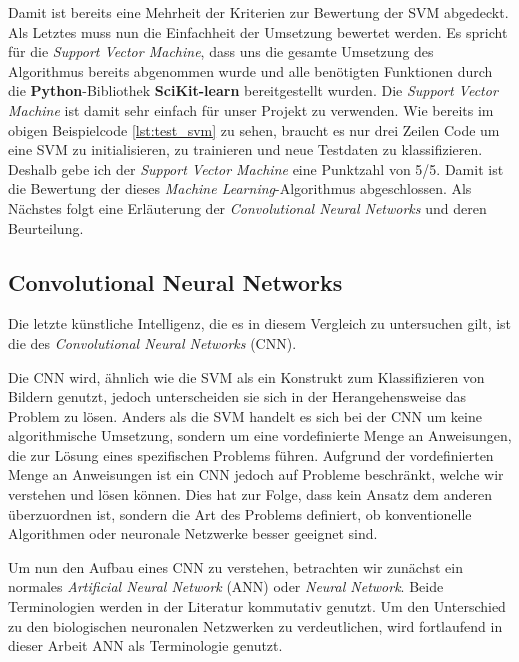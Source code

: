 Damit ist bereits eine Mehrheit der Kriterien zur Bewertung der SVM abgedeckt. Als Letztes muss nun die Einfachheit der Umsetzung bewertet werden.
Es spricht für die \textit{Support Vector Machine}, dass uns die gesamte Umsetzung des Algorithmus bereits abgenommen wurde und alle benötigten
Funktionen durch die \textbf{Python}-Bibliothek \textbf{SciKit-learn} bereitgestellt wurden. Die \textit{Support Vector Machine} ist damit sehr einfach
für unser Projekt zu verwenden.  Wie bereits im obigen Beispielcode \ref{lst:test_svm} zu sehen, braucht es nur drei Zeilen Code um eine SVM zu initialisieren,
zu trainieren und neue Testdaten zu klassifizieren. Deshalb gebe ich der \textit{Support Vector Machine} eine Punktzahl von 5/5.
Damit ist die Bewertung der dieses \textit{Machine Learning}-Algorithmus abgeschlossen. 
Als Nächstes folgt eine Erläuterung der \textit{Convolutional Neural Networks} und deren Beurteilung.

\newpage

\subsection{Convolutional Neural Networks} \label{ssec:cnn}
Die letzte künstliche Intelligenz, die es in diesem Vergleich zu untersuchen gilt, ist die des \textit{Convolutional Neural Networks} (CNN).

Die CNN wird, ähnlich wie die SVM als ein Konstrukt zum Klassifizieren von Bildern genutzt, jedoch unterscheiden sie sich in der Herangehensweise das Problem zu lösen. Anders als die SVM handelt es sich bei der CNN um keine algorithmische Umsetzung, sondern um eine vordefinierte Menge an Anweisungen, die zur Lösung eines spezifischen Problems führen. Aufgrund der vordefinierten Menge an Anweisungen ist ein CNN jedoch auf Probleme beschränkt, welche wir verstehen und lösen können. Dies hat zur Folge, dass kein Ansatz dem anderen überzuordnen ist, sondern die Art des Problems definiert, ob konventionelle Algorithmen oder neuronale Netzwerke besser geeignet sind. \cite*{10.1007/978-3-319-45378-1_1}

Um nun den Aufbau eines CNN zu verstehen, betrachten wir zunächst ein normales \textit{Artificial Neural Network} (ANN) oder \textit{Neural Network}. Beide Terminologien werden in der Literatur kommutativ genutzt. Um den Unterschied zu den biologischen neuronalen Netzwerken zu verdeutlichen, wird fortlaufend in dieser Arbeit ANN als Terminologie genutzt.


